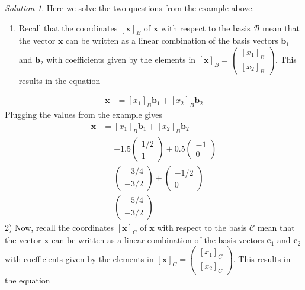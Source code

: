 \documentclass[
]{book}
\providecommand{\tightlist}{%
  \setlength{\itemsep}{0pt}\setlength{\parskip}{0pt}}
\theoremstyle{definition}
\theoremstyle{definition}
\theoremstyle{definition}
\theoremstyle{definition}
\theoremstyle{remark}
\newtheorem*{solution}{Solution}
\begin{document}
\begin{solution}

Here we solve the two questions from the example above.

\begin{enumerate}
\def\labelenumi{\arabic{enumi})}
\tightlist
\item
  Recall that the coordinates \(\left[\mathbf{x}\right]_B\) of \(\mathbf{x}\) with respect to the basis \(\mathcal{B}\) mean that the vector \(\mathbf{x}\) can be written as a linear combination of the basis vectors \(\mathbf{b}_1\) and \(\mathbf{b}_2\) with coefficients given by the elements in \(\left[\mathbf{x}\right]_B = \begin{pmatrix} \left[x_1\right]_B \\ \left[x_2\right]_B \end{pmatrix}\). This results in the equation
\end{enumerate}

\[
\begin{aligned}
\mathbf{x} & = \left[x_1\right]_B \mathbf{b}_1 + \left[x_2\right]_B \mathbf{b}_2
\end{aligned}
\]
Plugging the values from the example gives
\[
\begin{aligned}
\mathbf{x} & = \left[x_1\right]_B \mathbf{b}_1 + \left[x_2\right]_B \mathbf{b}_2 \\
& = -1.5 \begin{pmatrix} 1/2 \\ 1 \end{pmatrix} + 0.5 \begin{pmatrix} -1 \\ 0 \end{pmatrix} \\
& = \begin{pmatrix} -3/4 \\ -3/2 \end{pmatrix} + \begin{pmatrix} -1/2 \\ 0 \end{pmatrix} \\
& = \begin{pmatrix} -5/4 \\ -3/2 \end{pmatrix}
\end{aligned}
\]
2) Now, recall the coordinates \(\left[\mathbf{x}\right]_C\) of \(\mathbf{x}\) with respect to the basis \(\mathcal{C}\) mean that the vector \(\mathbf{x}\) can be written as a linear combination of the basis vectors \(\mathbf{c}_1\) and \(\mathbf{c}_2\) with coefficients given by the elements in \(\left[\mathbf{x}\right]_C = \begin{pmatrix} \left[x_1\right]_C \\ \left[x_2\right]_C \end{pmatrix}\). This results in the equation


\end{solution}
\end{document}
